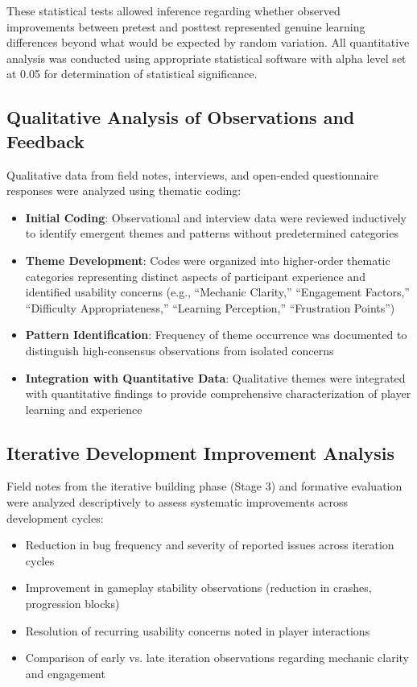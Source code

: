 These statistical tests allowed inference regarding whether observed improvements between pretest and posttest represented genuine learning differences beyond what would be expected by random variation. All quantitative analysis was conducted using appropriate statistical software with alpha level set at 0.05 for determination of statistical significance.

\subsection{Qualitative Analysis of Observations and Feedback}

Qualitative data from field notes, interviews, and open-ended questionnaire responses were analyzed using thematic coding:

\begin{itemize}
    \item \textbf{Initial Coding}: Observational and interview data were reviewed inductively to identify emergent themes and patterns without predetermined categories
    \item \textbf{Theme Development}: Codes were organized into higher-order thematic categories representing distinct aspects of participant experience and identified usability concerns (e.g., ``Mechanic Clarity,'' ``Engagement Factors,'' ``Difficulty Appropriateness,'' ``Learning Perception,'' ``Frustration Points'')
    \item \textbf{Pattern Identification}: Frequency of theme occurrence was documented to distinguish high-consensus observations from isolated concerns
    \item \textbf{Integration with Quantitative Data}: Qualitative themes were integrated with quantitative findings to provide comprehensive characterization of player learning and experience
\end{itemize}

\subsection{Iterative Development Improvement Analysis}

Field notes from the iterative building phase (Stage 3) and formative evaluation were analyzed descriptively to assess systematic improvements across development cycles:

\begin{itemize}
    \item Reduction in bug frequency and severity of reported issues across iteration cycles
    \item Improvement in gameplay stability observations (reduction in crashes, progression blocks)
    \item Resolution of recurring usability concerns noted in player interactions
    \item Comparison of early vs. late iteration observations regarding mechanic clarity and engagement
\end{itemize}

